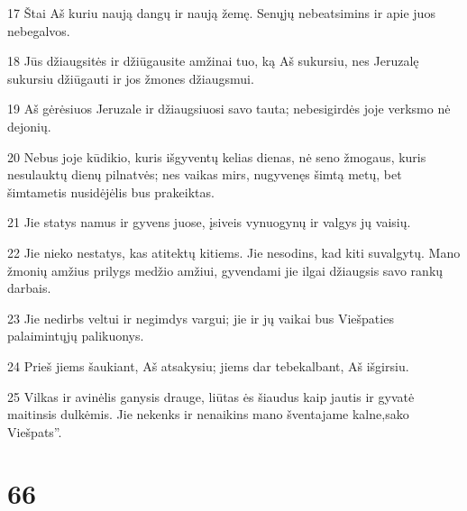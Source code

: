 \par 17 Štai Aš kuriu naują dangų ir naują žemę. Senųjų nebeatsimins ir apie juos nebegalvos. 
\par 18 Jūs džiaugsitės ir džiūgausite amžinai tuo, ką Aš sukursiu, nes Jeruzalę sukursiu džiūgauti ir jos žmones džiaugsmui. 
\par 19 Aš gėrėsiuos Jeruzale ir džiaugsiuosi savo tauta; nebesigirdės joje verksmo nė dejonių. 
\par 20 Nebus joje kūdikio, kuris išgyventų kelias dienas, nė seno žmogaus, kuris nesulauktų dienų pilnatvės; nes vaikas mirs, nugyvenęs šimtą metų, bet šimtametis nusidėjėlis bus prakeiktas. 
\par 21 Jie statys namus ir gyvens juose, įsiveis vynuogynų ir valgys jų vaisių. 
\par 22 Jie nieko nestatys, kas atitektų kitiems. Jie nesodins, kad kiti suvalgytų. Mano žmonių amžius prilygs medžio amžiui, gyvendami jie ilgai džiaugsis savo rankų darbais. 
\par 23 Jie nedirbs veltui ir negimdys vargui; jie ir jų vaikai bus Viešpaties palaimintųjų palikuonys. 
\par 24 Prieš jiems šaukiant, Aš atsakysiu; jiems dar tebekalbant, Aš išgirsiu. 
\par 25 Vilkas ir avinėlis ganysis drauge, liūtas ės šiaudus kaip jautis ir gyvatė maitinsis dulkėmis. Jie nekenks ir nenaikins mano šventajame kalne,­sako Viešpats”.



\chapter{66}


